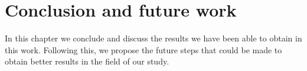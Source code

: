 \chapter{Conclusion and future work}
\label{kap:kap5}

In this chapter we conclude and discuss the results we have been able to
obtain in this work. Following this, we propose the future steps that could
be made to obtain better results in the field of our study.